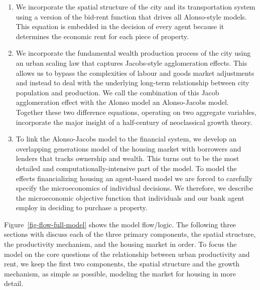 \begin{enumerate}
\item We incorporate the spatial structure of the city and its transportation system using a version of the \gls{bid-rent function} that drives all Alonso-style models. This equation is embedded in the decision of every agent because it determines the economic rent for each piece of property.

\item We incorporate the fundamental wealth production process of the city using an \gls{urban scaling} law that captures Jacobs-style agglomeration effects. This allows us to bypass the complexities of labour and goods market adjustments and instead to deal with the underlying long-term relationship between city population and production. We call the combination of this Jacob agglomeration effect with the Alonso model an \gls{Alonso-Jacobs model}. Together these two difference equations, operating on two aggregate variables, incorporate the major insight of a half-century of \gls{neoclassical growth theory}.

\item To link the Alonso-Jacobs model to the financial system, we develop an \gls{overlapping generations} model of the housing market with borrowers and lenders that tracks ownership and wealth. This turns out to be the most detailed and computationally-intensive part of the model. To model the effects financializing housing an \gls{agent-based model} we are forced to carefully specify the microeconomics of individual decisions. %
We therefore, we describe the microeconomic objective function that individuals and our bank agent employ in deciding to purchase a property. 
\end{enumerate}

Figure~\ref{fig-flow-full-model} shows the model flow/logic.  The following three sections with discuss each of the three primary components, the spatial structure, the productivity mechanism, and the housing market in order.  To focus the model on the core questions of the relationship between urban productivity and rent, we keep the first two components,  the spatial structure and the growth mechanism,  as simple as possible, modeling the market for housing in more detail. 



